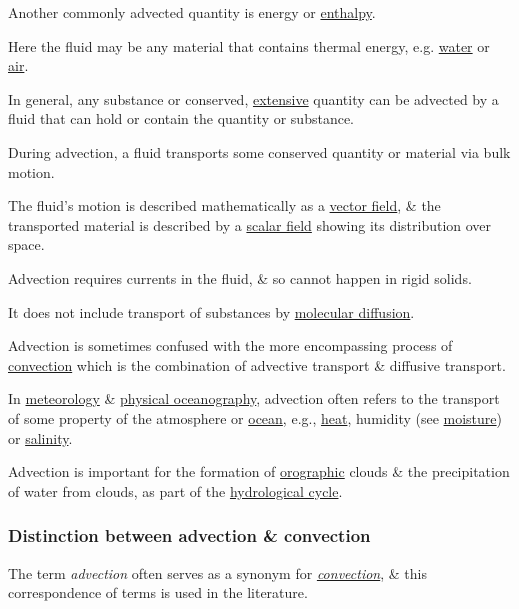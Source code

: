 \documentclass{article}
\begin{document}
Another commonly advected quantity is energy or \href{https://en.wikipedia.org/wiki/Enthalpy}{enthalpy}.

Here the fluid may be any material that contains thermal energy, e.g. \href{https://en.wikipedia.org/wiki/Water}{water} or \href{https://en.wikipedia.org/wiki/Air}{air}.

In general, any substance or conserved, \href{https://en.wikipedia.org/wiki/Intensive_and_extensive_properties}{extensive} quantity can be advected by a fluid that can hold or contain the quantity or substance.

%
During advection, a fluid transports some conserved quantity or material via bulk motion.

The fluid's motion is described mathematically as a \href{https://en.wikipedia.org/wiki/Vector_field}{vector field}, \& the transported material is described by a \href{https://en.wikipedia.org/wiki/Scalar_field}{scalar field} showing its distribution over space.

Advection requires currents in the fluid, \& so cannot happen in rigid solids.

It does not include transport of substances by \href{https://en.wikipedia.org/wiki/Molecular_diffusion}{molecular diffusion}.

%
Advection is sometimes confused with the more encompassing process of \href{https://en.wikipedia.org/wiki/Convection}{convection} which is the combination of advective transport \& diffusive transport.

%
In \href{https://en.wikipedia.org/wiki/Meteorology}{meteorology} \& \href{https://en.wikipedia.org/wiki/Physical_oceanography}{physical oceanography}, advection often refers to the transport of some property of the atmosphere or \href{https://en.wikipedia.org/wiki/Ocean}{ocean}, e.g., \href{https://en.wikipedia.org/wiki/Heat}{heat}, humidity (see \href{https://en.wikipedia.org/wiki/Water_vapor}{moisture}) or \href{https://en.wikipedia.org/wiki/Salinity}{salinity}.

Advection is important for the formation of \href{https://en.wikipedia.org/wiki/Orographic}{orographic} clouds \& the precipitation of water from clouds, as part of the \href{https://en.wikipedia.org/wiki/Hydrological_cycle}{hydrological cycle}.

\subsubsection{Distinction between advection \& convection}
The term {\it advection} often serves as a synonym for \href{https://en.wikipedia.org/wiki/Convection}{{\it convection}}, \& this correspondence of terms is used in the literature.
\end{document}
